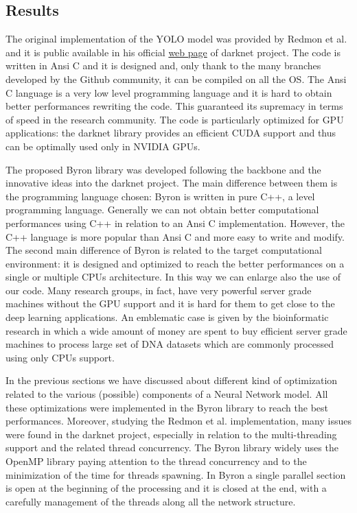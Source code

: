 \documentclass{standalone}
\begin{document}
\subsection[Results]{Results}\label{obj_detection:results}

The original implementation of the YOLO model was provided by Redmon et al. and it is public available in his official \href{https://pjreddie.com/darknet/yolo}{web page} of \textsf{darknet} project.
The code is written in Ansi C and it is designed and, only thank to the many branches developed by the Github community, it can be compiled on all the OS.
The \textsf{Ansi C} language is a very low level programming language and it is hard to obtain better performances rewriting the code.
This guaranteed its supremacy in terms of speed in the research community.
The code is particularly optimized for GPU applications: the \textsf{darknet} library provides an efficient CUDA support and thus can be optimally used only in NVIDIA GPUs.

The proposed \textsf{Byron} library was developed following the backbone and the innovative ideas into the \textsf{darknet} project.
The main difference between them is the programming language chosen: \textsf{Byron} is written in pure \textsf{C++}, a  level programming language.
Generally we can not obtain better computational performances using \textsf{C++} in relation to an Ansi C implementation.
However, the \textsf{C++} language is more popular than \textsf{Ansi C} and more easy to write and modify.
The second main difference of \textsf{Byron} is related to the target computational environment: it is designed and optimized to reach the better performances on a single or multiple CPUs architecture.
In this way we can enlarge also the use of our code.
Many research groups, in fact, have very powerful server grade machines without the GPU support and it is hard for them to get close to the deep learning applications.
An emblematic case is given by the bioinformatic research in which a wide amount of money are spent to buy efficient server grade machines to process large set of DNA datasets which are commonly processed using only CPUs support.

In the previous sections we have discussed about different kind of optimization related to the various (possible) components of a Neural Network model.
All these optimizations were implemented in the \textsf{Byron} library to reach the best performances.
Moreover, studying the Redmon et al. implementation, many issues were found in the \textsf{darknet} project, especially in relation to the multi-threading support and the related thread concurrency.
The \textsf{Byron} library widely uses the OpenMP library paying attention to the thread concurrency and to the minimization of the time for threads spawning.
In \textsf{Byron} a single parallel section is open at the beginning of the processing and it is closed at the end, with a carefully management of the threads along all the network structure.
\end{document}
